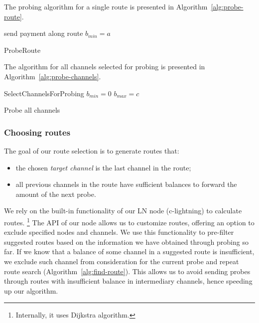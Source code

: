 The probing algorithm for a single route is presented in Algorithm~\ref{alg:probe-route}.

\begin{algorithm}
	send payment along route\;
	 {
		$b_{min} = a$\;
	}
	\caption{ProbeRoute}
	\label{alg:probe-route}
\end{algorithm}

The algorithm for all channels selected for probing is presented in Algorithm~\ref{alg:probe-channels}.

\begin{algorithm}
	SelectChannelsForProbing\;
	 {	
		$b_{min} = 0$\;
		$b_{max} = c$\;
		 {
		}
	}
	\caption{Probe all channels}
	\label{alg:probe-channels}
\end{algorithm}


\subsubsection*{Choosing routes}
The goal of our route selection is to generate routes that:
\begin{itemize}
	\item the chosen \textit{target channel} is the last channel in the route;
	\item all previous channels in the route have sufficient balances to forward the amount of the next probe.
\end{itemize}

We rely on the built-in functionality of our LN node (c-lightning) to calculate routes.
\footnote{Internally, it uses Dijkstra algorithm.}
The API of our node allows us to customize routes, offering an option to exclude specified nodes and channels.
We use this functionality to pre-filter suggested routes based on the information we have obtained through probing so far.
If we know that a balance of some channel in a suggested route is insufficient, we exclude such channel from consideration for the current probe and repeat route search (Algorithm~\ref{alg:find-route}).
This allows us to avoid sending probes through routes with insufficient balance in intermediary channels, hence speeding up our algorithm.


